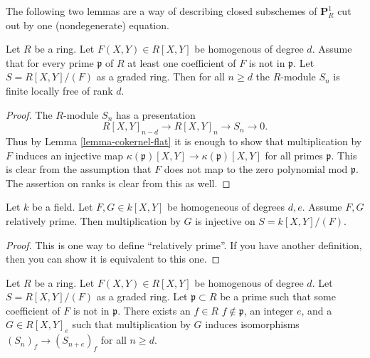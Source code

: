 \noindent
The following two lemmas are a way of describing closed
subschemes of $\mathbf{P}^1_R$ cut out by one (nondegenerate)
equation.

\begin{lemma}
\label{lemma-P1}
Let $R$ be a ring.
Let $F(X, Y) \in R[X, Y]$ be homogenous of degree
$d$. Assume that for every prime $\mathfrak p$ of $R$
at least one coefficient of $F$ is not in $\mathfrak p$.
Let $S = R[X, Y]/(F)$ as a graded ring.
Then for all $n \geq d$ the $R$-module $S_n$
is finite locally free of rank $d$.
\end{lemma}

\begin{proof}
The $R$-module $S_n$ has a presentation
$$
R[X, Y]_{n-d} \to R[X, Y]_n \to S_n \to 0.
$$
Thus by Lemma \ref{lemma-cokernel-flat}
it is enough to show that multiplication
by $F$ induces an injective map
$\kappa(\mathfrak p)[X, Y]
\to \kappa(\mathfrak p)[X, Y]$
for all primes $\mathfrak p$.
This is clear from the assumption that
$F$ does not map to the zero polynomial mod $\mathfrak p$.
The assertion on ranks is clear from this as well.
\end{proof}

\begin{lemma}
\label{lemma-rel-prime-pols}
Let $k$ be a field. Let $F, G \in k[X, Y]$ be homogeneous
of degrees $d, e$. Assume $F, G$ relatively prime.
Then multiplication by $G$ is injective on $S = k[X, Y]/(F)$.
\end{lemma}

\begin{proof}
This is one way to define ``relatively prime''. If you have another
definition, then you can show it is equivalent to this one.
\end{proof}

\begin{lemma}
\label{lemma-P1-localize}
Let $R$ be a ring. Let $F(X, Y) \in R[X, Y]$ be homogenous of degree
$d$. Let $S = R[X, Y]/(F)$ as a graded ring.
Let $\mathfrak p \subset R$ be a prime such that
some coefficient of $F$ is not in $\mathfrak p$.
There exists an $f \in R$ $f \not\in \mathfrak p$,
an integer $e$, and a $G \in R[X, Y]_e$
such that multiplication by $G$ induces isomorphisms
$(S_n)_f \to (S_{n + e})_f$ for all $n \geq d$.
\end{lemma}

